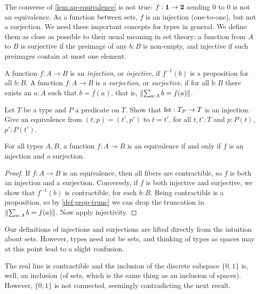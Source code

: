 \begin{definition}
The converse of \cref{lem:ap-equivalence} is not
true: $f:\mathbf{1}\to\mathbf{2}$ sending $0$ to $0$ is not an
equivalence. As a function between sets,
$f$ is an injection (one-to-one), but not a surjection.
We need these important concepts for types in general.
We define them as close as possible to their
usual meaning in set theory: a function from $A$ to $B$ is 
surjective if the preimage of any $b:B$ is non-empty,
and injective if such preimages contain at most one element.

\begin{definition}\label{def:injection}
A function $f:A\to B$ is an \emph{injection}, or \emph{injective}, 
if $f^{-1}(b)$ is a proposition for all $b:B$.
A function $f:A\to B$ is a \emph{surjection}, or \emph{surjective},
if for all $b:B$ there exists an $a:A$ such that $b=f(a)$,
that is, $\lVert\sum_{a:A} b=f(a)\rVert$.

\end{definition}

\begin{xca}\label{xca:subtype-to-type-injection}
Let $T$ be a type and $P$ a predicate on $T$.
Show that $\fst : T_P \to T$ is an injection.
Give an equivalence from $(t,p)=(t',p')$ to $t=t'$, for all $t,t':T$ and
$p:P(t)$, $p':P(t')$.
\end{xca}

\begin{lemma}\label{lem:inj+surj}
For all types $A,B$, a function $f: A\to B$ is an equivalence 
if and only if $f$ is an injection and a surjection.
\end{lemma}

\begin{proof}
If $f: A\to B$ is an equivalence, then all fibers are contractible,
so $f$ is both an injection and a surjection. Conversely,
if $f$ is both injective and surjective, we show that
$f^{-1}(b)$ is contractible, for each $b:B$. 
Being contractible is a proposition, so by \cref{def:prop-trunc}
we can drop the truncation in $\lVert\sum_{a:A} b=f(a)\rVert$.
Now apply injectivity.
\end{proof}
\begin{remark}
  \label{rem:injectionsurjectionisnotwhatyouthink}
  Our definitions of injections and surjections are lifted directly from the intuition about sets.  However, types need not be sets, and thinking of types as spaces may at this point lead to a slight confusion.  

The real line is contractible and the inclusion of the discrete subspace $\{0,1\}$ is, well, an inclusion (of sets, which is the same thing as an inclusion of spaces).  However, $\{0,1\}$ is not connected, seemingly contradicting the next result.


\end{remark}
\end{definition}
